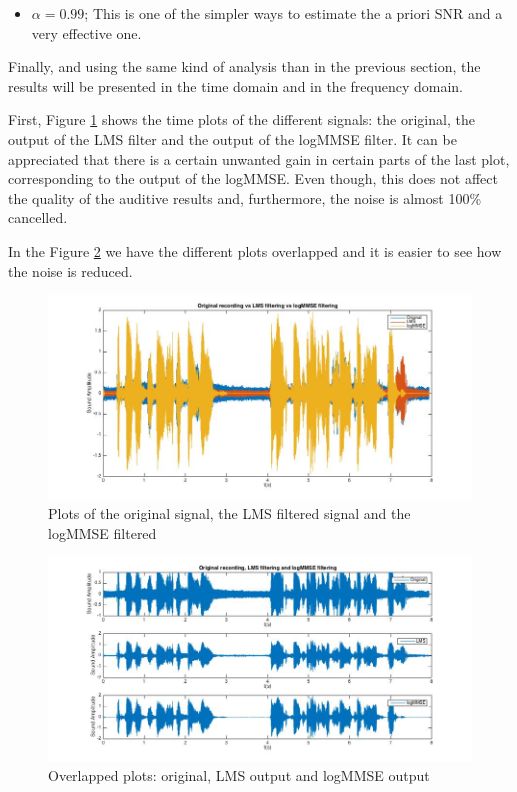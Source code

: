 \documentclass[11pt,a4paper,english]{book}  %
\theoremstyle{definition}  %
\theoremstyle{plain}  %
\theoremstyle{remark}  %
\begin{document}
\begin{itemize}
\item $\alpha=0.99$; This is one of the simpler ways to estimate the a priori SNR and a very effective one.
\end{itemize}

Finally, and using the same kind of analysis than in the previous section, the results will be presented in the time domain and in the frequency domain.

First, Figure \ref{fig:logmmse1} shows the time plots of the different signals: the original, the output of the LMS filter and the output of the logMMSE filter. It can be appreciated that there is a certain unwanted gain in certain parts of the last plot, corresponding to the output of the logMMSE. Even though, this does not affect the quality of the auditive results and, furthermore, the noise is almost 100\% cancelled.

In the Figure \ref{fig:logmmse2} we have the different plots overlapped and it is easier to see how the noise is reduced.


		\begin{figure}[h]
		\centering
		\includegraphics[width=15cm]{images/theory/logmmse2.jpg}
		\caption{Plots of the original signal, the LMS filtered signal and the logMMSE filtered}
		\label{fig:logmmse1}
		\end{figure}
		
		
		\begin{figure}[h]
		\centering
		\includegraphics[width=15cm]{images/theory/logmmse3.jpg}
		\caption{Overlapped plots: original, LMS output and logMMSE output}
		\label{fig:logmmse2}
		\end{figure}
\end{document}
